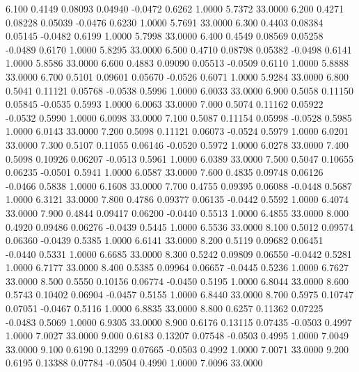    6.100   0.4149   0.08093   0.04940  -0.0472   0.6262   1.0000   5.7372  33.0000
   6.200   0.4271   0.08228   0.05039  -0.0476   0.6230   1.0000   5.7691  33.0000
   6.300   0.4403   0.08384   0.05145  -0.0482   0.6199   1.0000   5.7998  33.0000
   6.400   0.4549   0.08569   0.05258  -0.0489   0.6170   1.0000   5.8295  33.0000
   6.500   0.4710   0.08798   0.05382  -0.0498   0.6141   1.0000   5.8586  33.0000
   6.600   0.4883   0.09090   0.05513  -0.0509   0.6110   1.0000   5.8888  33.0000
   6.700   0.5101   0.09601   0.05670  -0.0526   0.6071   1.0000   5.9284  33.0000
   6.800   0.5041   0.11121   0.05768  -0.0538   0.5996   1.0000   6.0033  33.0000
   6.900   0.5058   0.11150   0.05845  -0.0535   0.5993   1.0000   6.0063  33.0000
   7.000   0.5074   0.11162   0.05922  -0.0532   0.5990   1.0000   6.0098  33.0000
   7.100   0.5087   0.11154   0.05998  -0.0528   0.5985   1.0000   6.0143  33.0000
   7.200   0.5098   0.11121   0.06073  -0.0524   0.5979   1.0000   6.0201  33.0000
   7.300   0.5107   0.11055   0.06146  -0.0520   0.5972   1.0000   6.0278  33.0000
   7.400   0.5098   0.10926   0.06207  -0.0513   0.5961   1.0000   6.0389  33.0000
   7.500   0.5047   0.10655   0.06235  -0.0501   0.5941   1.0000   6.0587  33.0000
   7.600   0.4835   0.09748   0.06126  -0.0466   0.5838   1.0000   6.1608  33.0000
   7.700   0.4755   0.09395   0.06088  -0.0448   0.5687   1.0000   6.3121  33.0000
   7.800   0.4786   0.09377   0.06135  -0.0442   0.5592   1.0000   6.4074  33.0000
   7.900   0.4844   0.09417   0.06200  -0.0440   0.5513   1.0000   6.4855  33.0000
   8.000   0.4920   0.09486   0.06276  -0.0439   0.5445   1.0000   6.5536  33.0000
   8.100   0.5012   0.09574   0.06360  -0.0439   0.5385   1.0000   6.6141  33.0000
   8.200   0.5119   0.09682   0.06451  -0.0440   0.5331   1.0000   6.6685  33.0000
   8.300   0.5242   0.09809   0.06550  -0.0442   0.5281   1.0000   6.7177  33.0000
   8.400   0.5385   0.09964   0.06657  -0.0445   0.5236   1.0000   6.7627  33.0000
   8.500   0.5550   0.10156   0.06774  -0.0450   0.5195   1.0000   6.8044  33.0000
   8.600   0.5743   0.10402   0.06904  -0.0457   0.5155   1.0000   6.8440  33.0000
   8.700   0.5975   0.10747   0.07051  -0.0467   0.5116   1.0000   6.8835  33.0000
   8.800   0.6257   0.11362   0.07225  -0.0483   0.5069   1.0000   6.9305  33.0000
   8.900   0.6176   0.13115   0.07435  -0.0503   0.4997   1.0000   7.0027  33.0000
   9.000   0.6183   0.13207   0.07548  -0.0503   0.4995   1.0000   7.0049  33.0000
   9.100   0.6190   0.13299   0.07665  -0.0503   0.4992   1.0000   7.0071  33.0000
   9.200   0.6195   0.13388   0.07784  -0.0504   0.4990   1.0000   7.0096  33.0000
